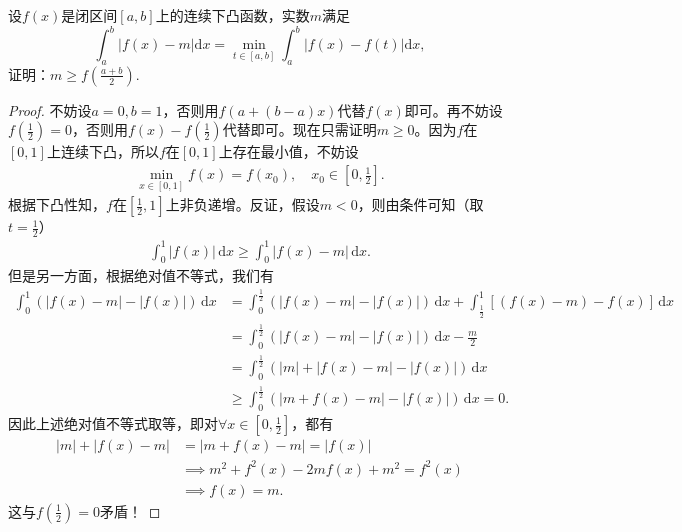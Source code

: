 \documentclass[../../main.tex]{subfiles}%
\begin{document}
\begin{example}
设\( f(x) \)是闭区间\( [a,b] \)上的连续下凸函数，实数\( m \)满足
\[
\int_{a}^{b}|f(x) - m|\mathrm{d}x = \min_{t \in [a,b]}\int_{a}^{b}|f(x) - f(t)|\mathrm{d}x,
\]
证明：\( m \geqslant f\left( \frac{a + b}{2} \right) \).
\end{example}
\begin{proof}
不妨设\( a=0, b=1 \)，否则用\( f(a+(b-a)x) \)代替\( f(x) \)即可。再不妨设\( f\left( \frac{1}{2} \right) =0 \)，否则用\( f(x)-f\left( \frac{1}{2} \right) \)代替即可。现在只需证明\( m \geqslant 0 \)。因为\( f \)在\( [0,1] \)上连续下凸，所以\( f \)在\( [0,1] \)上存在最小值，不妨设
\begin{align*}
\min_{x \in [0,1]} f(x) = f(x_0), \quad x_0 \in \left[ 0, \frac{1}{2} \right].
\end{align*}
根据下凸性知，\( f \)在\( \left[ \frac{1}{2},1 \right] \)上非负递增。反证，假设\( m < 0 \)，则由条件可知（取\( t=\frac{1}{2} \)）
\begin{align*}
\int_0^1 |f(x)|\,\mathrm{d}x \geqslant \int_0^1 |f(x)-m|\,\mathrm{d}x.
\end{align*}
但是另一方面，根据绝对值不等式，我们有
\begin{align*}
\int_0^1 \left( |f(x)-m| - |f(x)| \right)\,\mathrm{d}x &= \int_0^{\frac{1}{2}} \left( |f(x)-m| - |f(x)| \right)\,\mathrm{d}x + \int_{\frac{1}{2}}^1 \left[ (f(x)-m) - f(x) \right]\,\mathrm{d}x \\
&= \int_0^{\frac{1}{2}} \left( |f(x)-m| - |f(x)| \right)\,\mathrm{d}x - \frac{m}{2} \\
&= \int_0^{\frac{1}{2}} \left( |m| + |f(x)-m| - |f(x)| \right)\,\mathrm{d}x \\
&\geqslant \int_0^{\frac{1}{2}} \left( |m + f(x) - m| - |f(x)| \right)\,\mathrm{d}x = 0.
\end{align*}
因此上述绝对值不等式取等，即对\( \forall x \in \left[ 0, \frac{1}{2} \right] \)，都有
\begin{align*}
|m| + |f(x)-m| &= |m + f(x) - m| = |f(x)| \\
&\implies m^2 + f^2(x) - 2mf(x) + m^2 = f^2(x) \\
&\implies f(x) = m.
\end{align*}
这与\( f\left( \frac{1}{2} \right) = 0 \)矛盾！
\end{proof}
\end{document}
